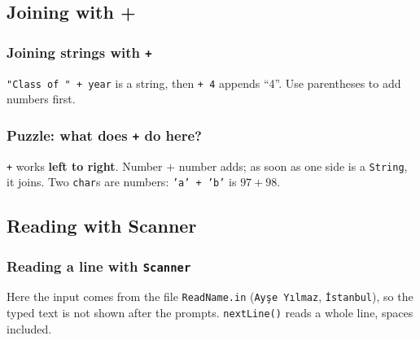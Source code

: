 \documentclass[aspectratio=169,10pt,compress]{beamer}
\begin{document}
\subsection[Plus]{Joining with +}




\begin{frame}[t,fragile] \frametitle{Joining strings with \texttt{+}}

  \vspace{0.3em}
  \small {} \texttt{"Class of " + year} is a string, then \texttt{+ 4} appends ``4''.
  Use parentheses to add numbers first.
\end{frame}




\begin{frame}[t,fragile] \frametitle{Puzzle: what does \texttt{+} do here?}

  \vspace{0.3em}
  \small \texttt{+} works \textbf{left to right}. Number $+$ number adds; as soon as one side is a \texttt{String}, it joins.
  Two \texttt{char}s are numbers: \texttt{'a' + 'b'} is $97 + 98$.
\end{frame}





\subsection[Scanner]{Reading with Scanner}




\begin{frame}[t,fragile] \frametitle{Reading a line with \texttt{Scanner}}

  \vspace{0.3em}
  \small Here the input comes from the file \texttt{ReadName.in} (\texttt{Ayşe Yılmaz}, \texttt{İstanbul}),
  so the typed text is not shown after the prompts. \texttt{nextLine()} reads a whole line, spaces included.
\end{frame}
\end{document}
